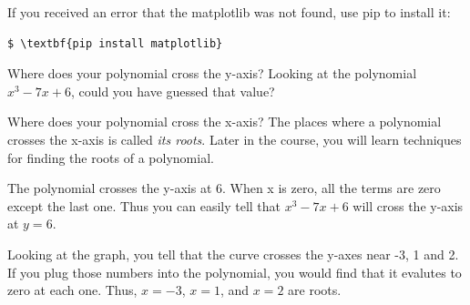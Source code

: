 If you received an error that the matplotlib was not found, use pip to install it:
\begin{Verbatim}[commandchars=\\\{\}]
$ \textbf{pip install matplotlib}
\end{Verbatim}

\begin{Exercise}[title={Observations}, label=plotobservations]
  Where does your polynomial cross the y-axis? Looking at the
  polynomial $x^3 - 7x + 6$, could you have guessed that value?

  \vspace{20mm}
  
  Where does your polynomial cross the x-axis? The places where a
  polynomial crosses the x-axis is called \emph{its roots}. Later in
  the course, you will learn techniques for finding the roots of a
  polynomial.
\end{Exercise}
\begin{Answer}[ref=plotobservations]
  The polynomial crosses the y-axis at 6. When x is zero, all the terms are zero except the
  last one. Thus you can easily tell that $x^3 - 7x + 6$ will cross the y-axis at $y=6$.

  Looking at the graph, you tell that the curve crosses the y-axes
  near -3, 1 and 2. If you plug those numbers into the polynomial, you
  would find that it evalutes to zero at each one. Thus, $x=-3$, $x=1$, and $x=2$ are roots.
\end{Answer}
